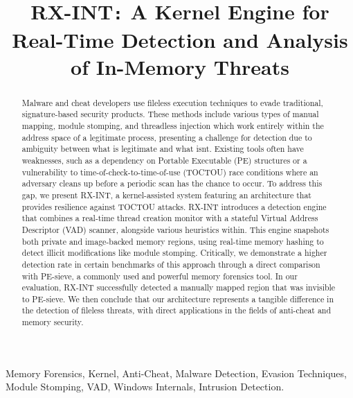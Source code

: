 \documentclass[journal]{IEEEtran}
\title{RX-INT\texttt{:} A Kernel Engine for Real-Time Detection and Analysis of In-Memory Threats}
\author{
    \IEEEauthorblockN{Arjun Juneja \\}
    \IEEEauthorblockA{School of Electronics and Computer Science\\
    University of Southampton\\
    aj2g24@soton.ac.uk}
}
\begin{document}
\maketitle

\begin{abstract}
Malware and cheat developers use fileless execution techniques to evade traditional, signature-based security products. These methods include various types of manual mapping, module stomping, and threadless injection which work entirely within the address space of a legitimate process, presenting a challenge for detection due to ambiguity between what is legitimate and what isnt. Existing tools often have weaknesses, such as a dependency on Portable Executable (PE) structures or a vulnerability to time-of-check-to-time-of-use (TOCTOU) race conditions where an adversary cleans up before a periodic scan has the chance to occur. To address this gap, we present RX-INT, a kernel-assisted system featuring an architecture that provides resilience against TOCTOU attacks. RX-INT introduces a detection engine that combines a real-time thread creation monitor with a stateful Virtual Address Descriptor (VAD) scanner, alongside various heuristics within. This engine snapshots both private and image-backed memory regions, using real-time memory hashing to detect illicit modifications like module stomping. Critically, we demonstrate a higher detection rate in certain benchmarks of this approach through a direct comparison with PE-sieve, a commonly used and powerful memory forensics tool. In our evaluation, RX-INT successfully detected a manually mapped region that was invisible to PE-sieve. We then conclude that our architecture represents a tangible difference in the detection of fileless threats, with direct applications in the fields of anti-cheat and memory security.
\end{abstract}

\begin{IEEEkeywords}
Memory Forensics, Kernel, Anti-Cheat, Malware Detection, Evasion Techniques, Module Stomping, VAD, Windows Internals, Intrusion Detection.
\end{IEEEkeywords}
\end{document}
